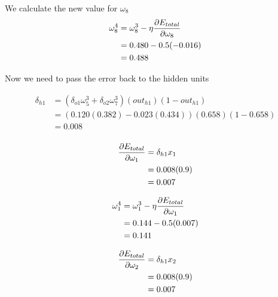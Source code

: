 \documentclass[10pt,a4paper]{article}
\begin{document}
We calculate the new value for $\omega_8$
\begin{equation}
\begin{split}
\omega_8^4 &= \omega_8^3 - \eta\pdv{E_{total}}{\omega_8}\\
           &= 0.480 -0.5(-0.016)\\
           &= 0.488\\
\end{split}
\end{equation}







Now we need to pass the error back to the hidden units

\begin{equation}
\begin{split}
\delta_{h1} &= (\delta_{o1}\omega_5^3 + \delta_{o2}\omega_7^3)(out_{h1})(1-out_{h1})\\
&= (0.120(0.382) -0.023(0.434))(0.658)(1-0.658)\\
&= 0.008\\
\end{split}
\end{equation}

\begin{equation}
\begin{split}
\pdv{E_{total}}{\omega_1} &= \delta_{h1}x_1\\ 
                          &= 0.008(0.9)\\
                          &= 0.007\\
\end{split}
\end{equation}

\begin{equation}
\begin{split}
\omega_1^4 &= \omega_1^3 - \eta\pdv{E_{total}}{\omega_1}\\
           &= 0.144 -0.5(0.007)\\
           &= 0.141\\
\end{split}
\end{equation}

\begin{equation}
\begin{split}
\pdv{E_{total}}{\omega_2} &= \delta_{h1}x_2\\ 
                          &= 0.008(0.9)\\
                          &= 0.007\\
\end{split}
\end{equation}
\end{document}
